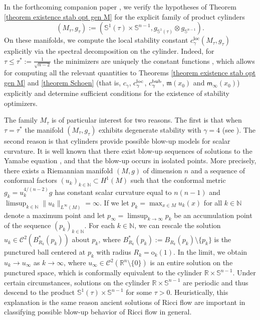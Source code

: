 \documentclass[reqno,11pt]{amsart}
\numberwithin{equation}{section}
\theoremstyle{definition}
\theoremstyle{remark}
\newcommand{\R}{\mathbb{R}}
\newcommand{\Ss}{\mathbb{S}}
\begin{document}
\medskip
{}
In the forthcoming companion paper \cite{AKRW-cylinder}, we verify the hypotheses of 
Theorem \ref{theorem existence stab opt gen M} for the explicit family of product 
cylinders 
\[
(M_\tau,g_\tau):= (\mathbb S^1(\tau) \times \mathbb S^{n-1},g_{\mathbb S^1(\tau)}\otimes g_{\mathbb S^{n-1}}).
\] 
On these manifolds, we compute the local
stability constant $c_{\gamma}^{\mathrm{loc}}(M_\tau, g_\tau)$ explicitly via the
spectral decomposition on the cylinder.
Indeed, for 
\(\tau \leqslant \tau^*:= \tfrac{1}{\sqrt{n-2}}\)
the minimizers are uniquely the constant 
functions \cite{Schoen1989}, which allows for computing all the relevant quantities to 
Theorems \ref{theorem existence stab opt gen M} and \ref{theorem Schoen} (that is, 
$c_\gamma$, $c_\gamma^{\rm loc}$, $c_\gamma^{\rm bub}$, $\mathfrak m(x_0)$ 
and $\mathsf m_\infty(x_0)$)  explicitly and determine sufficient conditions for the 
existence of stability optimizers. 

The family $M_\tau$ is of particular interest for 
two reasons. The first is that when $\tau = \tau^*$ the manifold $(M_\tau, g_\tau)$ 
exhibits degenerate stability with $\gamma = 4$ (see \cite{ENS, F}). The second reason
is that cylinders provide possible blow-up models for scalar curvature. It is well known
that there exist blow-up sequences of solutions to the Yamabe equation \cite{Khuri_Marques_Schoen, DHR}, and that the
blow-up occurs in isolated points. More precisely, there exists a Riemannian manifold
$(M,g)$ of dimension $n$ and a sequence
of conformal factors $(u_k)_{k\in\mathbb{N}}\subset H^1(M)$ such that the conformal metric $g_k = u_k^{{4}/{(n-2)}}
g$ has constant scalar curvature equal to $n(n-1)$ and
\(\limsup_{k \in \mathbb{N}} \| u_k \|_{L^\infty(M)} =\infty.\)
If we let $p_k=\max_{x\in M}u_k(x)$ for all $k\in\mathbb{N}$ denote a maximum point
and let $p_\infty=\limsup_{k\to\infty}p_k$ be an accumulation
point of the sequence $(p_k)_{k\in\mathbb{N}}$.
For each $k\in\mathbb{N}$, we can rescale the solution $u_k\in
\mathcal{C}^2(B_{R_k}^*(p_k))$ about $p_k$, where $B_{R_k}^*(p_k):=B_{R_k}(p_k)
\setminus\{p_k\}$ is the punctured ball centered at $p_k$ with radius
$R_k=\mathrm{o}_k(1)$. In the limit, we obtain $u_k\to u_\infty$ as $k\to\infty$,
where $u_\infty \in \mathcal{C}^2(\R^n \setminus \{ 0 \})$ is an entire
solution on the punctured space, which is conformally equivalent to the cylinder
$\R \times \Ss^{n-1}$. Under certain circumstances, solutions on the cylinder
$\R \times \Ss^{n-1}$ are periodic and thus descend to the product $\Ss^1(\tau)
\times \Ss^{n-1}$ for some $\tau>0$. Heuristically, this explanation is the
same reason ancient solutions of Ricci flow are important in classifying possible
blow-up behavior of Ricci flow in general.
\end{document}
